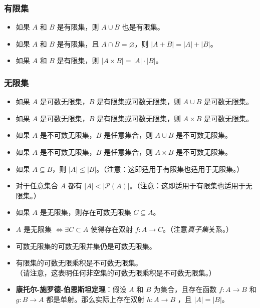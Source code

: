 \subsubsection*{有限集}

\begin{itemize}
    \item 如果 $A$ 和 $B$ 是有限集，则 $A \cup B$ 也是有限集。
    \item 如果 $A$ 和 $B$ 是有限集，且 $A \cap B = \varnothing$，则 $|A + B|= |A| + |B|$。
    \item 如果 $A$ 和 $B$ 是有限集，则 $|A \times B|= |A| \cdot |B|$。
\end{itemize}


\subsubsection*{无限集}

\begin{itemize}
    \item 如果 $A$ 是可数无限集，$B$ 是有限集或可数无限集，则 $A \cup B$ 是可数无限集。
    \item 如果 $A$ 是可数无限集，$B$ 是有限集或可数无限集，则 $A \times B$ 是可数无限集。
    \item 如果 $A$ 是不可数无限集，$B$ 是任意集合，则 $A \cup B$ 是不可数无限集。
    \item 如果 $A$ 是不可数无限集，$B$ 是任意集合，则 $A \times B$ 是不可数无限集。
    \item 如果 $A \subseteq B$，则 $|A| \le |B|$。（注意：这即适用于有限集也适用于无限集。）
    \item 对于任意集合 $A$ 都有 $|A| < |\mathcal{P}(A)|$。（注意：这即适用于有限集也适用于无限集。）
    \item 如果 $A$ 是无限集，则存在可数无限集 $C \subseteq A$。
    \item $A$ 是无限集 $\iff \exists C \subset A$ 使得存在双射 $f : A \to C$。（注意\emph{真子集}关系。）
    \item 可数无限集的可数无限并集仍是可数无限集。
    \item 有限集的可数无限乘积是不可数无限集。\\
          （请注意，这表明任何非空集的可数无限乘积是不可数无限集。）
    \item \textbf{康托尔-施罗德-伯恩斯坦定理}：假设 $A$ 和 $B$ 为集合，且存在函数 $f : A \to B$ 和 $g : B \to A$ 都是单射。那么实际上存在双射 $h : A \to B$ ，且 $|A| = |B|$。
\end{itemize}

